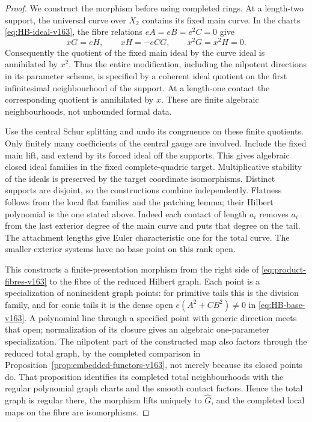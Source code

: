 \documentclass[11pt,reqno]{amsart}
\numberwithin{equation}{section}
\theoremstyle{definition}\newtheorem{definition}[theorem]{Definition}
\theoremstyle{remark}\newtheorem{remark}[theorem]{Remark}
\begin{document}
\begin{proof}
We construct the morphism before using completed rings. At a
length-two support, the universal curve over $X_2$ contains its
fixed main curve. In the charts \eqref{eq:HB-ideal-v163}, the fibre
relations $eA=eB=e^2C=0$ give
\[
             xG=eH,\qquad xH=-eCG,
             \qquad x^2G=x^2H=0.
\]
Consequently the quotient of the fixed main ideal by the curve ideal
is annihilated by $x^2$. Thus the entire modification, including the
nilpotent directions in its parameter scheme, is specified by a
coherent ideal quotient on the first infinitesimal neighbourhood of
the support. At a length-one contact the corresponding quotient is
annihilated by $x$. These are finite algebraic neighbourhoods, not
unbounded formal data.

Use the central Schur splitting and undo its congruence on these
finite quotients. Only finitely many coefficients of the central
gauge are involved. Include the fixed main lift, and extend by its
forced ideal off the supports. This gives algebraic closed ideal
families in the fixed complete-quadric target. Multiplicative
stability of the ideals is preserved by the target coordinate
isomorphisms. Distinct supports are disjoint, so the constructions
combine independently. Flatness follows from the local flat
families and the patching lemma; their Hilbert polynomial is the
one stated above. Indeed each contact of length $a_i$ removes
$a_i$ from the last exterior degree of the main curve and puts
that degree on the tail. The attachment lengths give Euler
characteristic one for the total curve. The smaller exterior
systems have no base point on this rank open.

This constructs a finite-presentation morphism from the right side
of \eqref{eq:product-fibres-v163} to the fibre of the reduced Hilbert
graph. Each point is a specialization of nonincident graph points:
for primitive tails this is the division family, and for conic tails
it is the dense open $e(A^2+CB^2)\ne0$ in
\eqref{eq:HB-base-v163}. A polynomial line through a specified
point with generic direction meets that open; normalization of
its closure gives an algebraic one-parameter specialization.
The nilpotent part of the constructed map also factors through
the reduced total graph, by the completed comparison in
Proposition~\ref{prop:embedded-functors-v163}, not merely because
its closed points do. That proposition identifies its completed
total neighbourhoods with the regular polynomial graph charts
and the smooth contact factors. Hence the total graph is regular
there, the morphism lifts uniquely to $\widehat G$, and the
completed local maps on the fibre are isomorphisms.


\end{proof}
\end{document}
